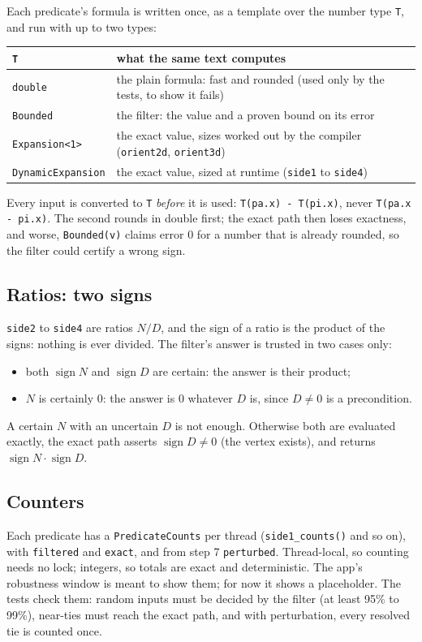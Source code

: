 \documentclass[11pt,a4paper]{article}
\newcommand{\code}[1]{\texttt{#1}}
\newcommand{\sgn}{\operatorname{sign}}
\theoremstyle{definition}
\theoremstyle{remark}
\begin{document}
Each predicate's formula is written once, as a template over the number type \code{T}, and run
with up to two types:
\begin{center}
\begin{tabularx}{\linewidth}{@{}l L@{}}
  \toprule
  \code{T} & what the same text computes \\
  \midrule
  \code{double} & the plain formula: fast and rounded (used only by the tests, to show it fails) \\
  \code{Bounded} & the filter: the value and a proven bound on its error \\
  \code{Expansion<1>} & the exact value, sizes worked out by the compiler (\code{orient2d},
    \code{orient3d}) \\
  \code{DynamicExpansion} & the exact value, sized at runtime (\code{side1} to \code{side4}) \\
  \bottomrule
\end{tabularx}
\end{center}
Every input is converted to \code{T} \emph{before} it is used: \code{T(pa.x) - T(pi.x)}, never
\code{T(pa.x - pi.x)}. The second rounds in double first; the exact path then loses exactness, and
worse, \code{Bounded(v)} claims error 0 for a number that is already rounded, so the filter could
certify a wrong sign.

\subsection{Ratios: two signs}

\code{side2} to \code{side4} are ratios $N/D$, and the sign of a ratio is the product of the
signs: nothing is ever divided. The filter's answer is trusted in two cases only:
\begin{itemize}
  \item both $\sgn N$ and $\sgn D$ are certain: the answer is their product;
  \item $N$ is certainly 0: the answer is 0 whatever $D$ is, since $D \ne 0$ is a precondition.
\end{itemize}
A certain $N$ with an uncertain $D$ is not enough. Otherwise both are evaluated exactly, the exact
path asserts $\sgn D \ne 0$ (the vertex exists), and returns $\sgn N\cdot\sgn D$.

\subsection{Counters}

Each predicate has a \code{PredicateCounts} per thread (\code{side1\_counts()} and so on), with
\code{filtered} and \code{exact}, and from step 7 \code{perturbed}. Thread-local, so counting needs
no lock; integers, so totals are exact and deterministic. The app's robustness window is meant to
show them; for now it shows a placeholder. The tests check them: random inputs must be decided by the filter (at least 95\% to 99\%),
near-ties must reach the exact path, and with perturbation, every resolved tie is counted once.
\end{document}
